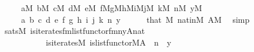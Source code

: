 \begin{isabellebody}
\ \ \ \ \ {\isachardoublequoteopen}a{\isasymin}M{\isachardoublequoteclose}\ {\isachardoublequoteopen}b{\isasymin}M{\isachardoublequoteclose}\ {\isachardoublequoteopen}c{\isasymin}M{\isachardoublequoteclose}\ {\isachardoublequoteopen}d{\isasymin}M{\isachardoublequoteclose}\ {\isachardoublequoteopen}e{\isasymin}M{\isachardoublequoteclose}\ {\isachardoublequoteopen}f{\isasymin}M{\isachardoublequoteclose}{\isachardoublequoteopen}g{\isasymin}M{\isachardoublequoteclose}{\isachardoublequoteopen}h{\isasymin}M{\isachardoublequoteclose}{\isachardoublequoteopen}i{\isasymin}M{\isachardoublequoteclose}{\isachardoublequoteopen}j{\isasymin}M{\isachardoublequoteclose}\ {\isachardoublequoteopen}k{\isasymin}M{\isachardoublequoteclose}\ {\isachardoublequoteopen}n{\isasymin}M{\isachardoublequoteclose}\ {\isachardoublequoteopen}y{\isasymin}M{\isachardoublequoteclose}\isanewline
\ \ \ \ \ a\ b\ c\ d\ e\ f\ g\ h\ i\ j\ k\ n\ y\isanewline
\ \ \ \ \isamarkupfalse%
\ that\ {\isacartoucheopen}{}{\isasymin}M{\isacartoucheclose}\ nat{\isacharunderscore}{\kern0pt}in{\isacharunderscore}{\kern0pt}M\ {\isacartoucheopen}A{\isasymin}M{\isacartoucheclose}\ \isamarkupfalse%
\ simp\isanewline
\ \ \isamarkupfalse%
\isanewline
\ \ \isamarkupfalse%
\ {}{\isacharcolon}{\kern0pt}{\isachardoublequoteopen}sats{\isacharparenleft}{\kern0pt}M{\isacharcomma}{\kern0pt}\ is{\isacharunderscore}{\kern0pt}iterates{\isacharunderscore}{\kern0pt}fm{\isacharparenleft}{\kern0pt}list{\isacharunderscore}{\kern0pt}functor{\isacharunderscore}{\kern0pt}fm{\isacharparenleft}{\kern0pt}{}{}{\isacharcomma}{\kern0pt}{}{\isacharcomma}{\kern0pt}{}{\isacharparenright}{\kern0pt}{\isacharcomma}{\kern0pt}{}{\isacharcomma}{\kern0pt}{}{\isacharcomma}{\kern0pt}{}{\isacharparenright}{\kern0pt}{\isacharcomma}{\kern0pt}{\isacharbrackleft}{\kern0pt}n{\isacharcomma}{\kern0pt}y{\isacharcomma}{\kern0pt}A{\isacharcomma}{\kern0pt}{}{\isacharcomma}{\kern0pt}nat{\isacharbrackright}{\kern0pt}\ {\isacharparenright}{\kern0pt}\ {\isasymlongleftrightarrow}\isanewline
\ \ \ \ \ \ \ \ \ \ \ is{\isacharunderscore}{\kern0pt}iterates{\isacharparenleft}{\kern0pt}{\isacharhash}{\kern0pt}{\isacharhash}{\kern0pt}M{\isacharcomma}{\kern0pt}\ is{\isacharunderscore}{\kern0pt}list{\isacharunderscore}{\kern0pt}functor{\isacharparenleft}{\kern0pt}{\isacharhash}{\kern0pt}{\isacharhash}{\kern0pt}M{\isacharcomma}{\kern0pt}A{\isacharparenright}{\kern0pt}{\isacharcomma}{\kern0pt}\ {}{\isacharcomma}{\kern0pt}\ n\ {\isacharcomma}{\kern0pt}\ y{\isacharparenright}{\kern0pt}{\isachardoublequoteclose}\isanewline

\end{isabellebody}
